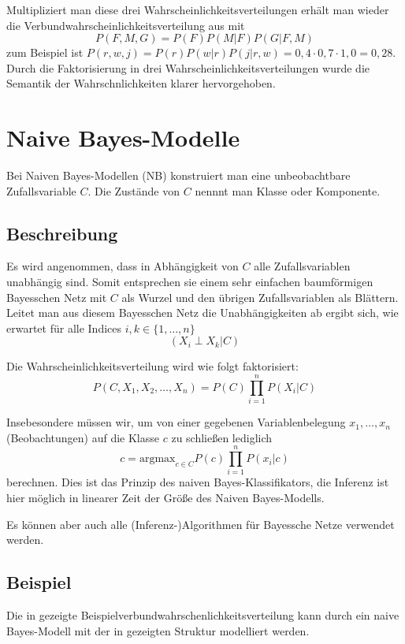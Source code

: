 \documentclass{llncs}
\begin{document}
Multipliziert man diese drei Wahrscheinlichkeitsverteilungen erhält man wieder die Verbundwahrscheinlichkeitsverteilung aus  mit 
\[P(F,M,G) = P(F) P(M|F) P(G|F,M)\]
zum Beispiel ist $ P(r,w,j) = P(r) P(w|r) P(j|r,w) = 0,4 \cdot 0,7 \cdot 1,0 = 0,28 $. Durch die Faktorisierung in drei Wahrscheinlichkeitsverteilungen wurde die Semantik der Wahrschnlichkeiten klarer hervorgehoben. 

\section{Naive Bayes-Modelle}

Bei Naiven Bayes-Modellen\cite{lowd2005naive} (NB) konstruiert man eine unbeobachtbare Zufallsvariable $C$. Die Zustände von $C$ nennnt man Klasse oder Komponente. 

\subsection{Beschreibung}

Es wird angenommen, dass in Abhängigkeit von $C$ alle Zufallsvariablen unabhängig sind. Somit entsprechen sie einem sehr einfachen baumförmigen Bayesschen Netz mit $C$ als Wurzel und den übrigen Zufallsvariablen als Blättern. Leitet man aus diesem Bayesschen Netz die Unabhängigkeiten ab ergibt sich, wie erwartet für alle Indices $i,k \in \{1,\dots,n\}$
\[ (X_i \perp X_k | C) \]

Die Wahrscheinlichkeitsverteilung wird wie folgt faktorisiert: 
\[ P(C,X_1,X_2,\dots,X_n) = P(C) \prod_{i=1}^n P(X_i|C) \]

Insebesondere müssen wir, um von einer gegebenen Variablenbelegung $x_1,\dots,x_n$  (Beobachtungen) 
auf die Klasse $c$ zu schließen lediglich
\[ c = \mbox{argmax}_{c \in C} P(c) \prod_{i=1}^n P(x_i|c) \]
berechnen. Dies ist das Prinzip des naiven Bayes-Klassifikators, die Inferenz ist hier möglich in linearer Zeit der Größe des Naiven Bayes-Modells. 

Es können aber auch alle (Inferenz-)Algorithmen für Bayessche Netze verwendet werden. 

\subsection{Beispiel}

Die in  gezeigte Beispielverbundwahrschenlichkeitsverteilung kann durch ein naive Bayes-Modell mit der in  gezeigten Struktur modelliert werden. 
\end{document}
